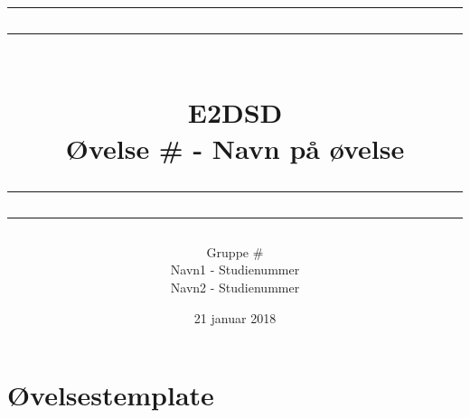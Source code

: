 \documentclass[12pt,a4paper]{article}
\newcommand\mymaketitle[1]{
   \rule{\textwidth}{1.6pt}\vspace*{-\baselineskip}\vspace*{2pt}
   \rule{\textwidth}{0.4pt}
   \\  
   \huge \bf #1\\
   \vspace{-8pt}
   \rule{\textwidth}{0.4pt}\vspace*{-\baselineskip}\vspace{3.2pt}
   \rule{\textwidth}{1.6pt}
}
\begin{document}
\title{
	\mymaketitle{E2DSD\\Øvelse \# - Navn på øvelse}
}
\author{
	Gruppe \#\\
	Navn1 - Studienummer\\
	Navn2 - Studienummer
}
\date{21 januar 2018}

\maketitle

\section{Øvelsestemplate}
\end{document}
